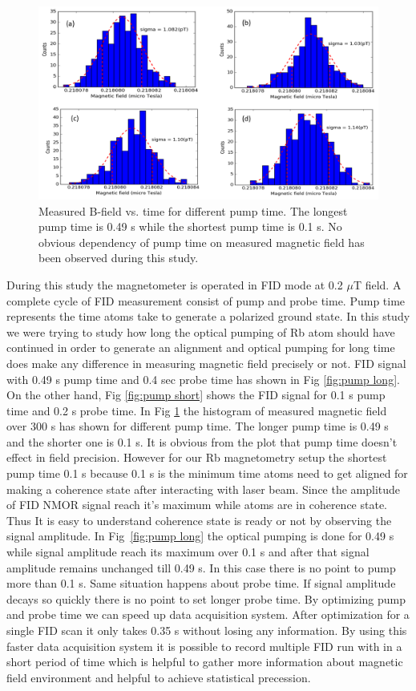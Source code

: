    \begin{figure}[h]
\centering\includegraphics[width=0.75\linewidth]{figures/pump_time}
\caption{Measured B-field vs. time   for different pump time. The longest pump time is 0.49 s while the shortest pump time is 0.1 s. No obvious dependency of pump time on  measured magnetic field has been observed during this study.\label{fig:different pump time}}
\end{figure}
During this study the magnetometer is operated in FID mode at 0.2 $ \mu$T field.  A complete cycle of FID measurement consist of pump and probe time. Pump time represents the time atoms take to generate a polarized ground state. In this study we were trying to study how long the optical pumping of Rb atom should have continued in order to generate an alignment and optical pumping for long time does make any difference in measuring magnetic field precisely or not. FID signal with 0.49 s pump time and 0.4 sec probe time has shown in Fig \ref{fig:pump long}. On the other hand, Fig \ref{fig:pump short} shows  the FID signal for 0.1 s pump time and 0.2 s probe time. In Fig \ref{fig:different pump time} the histogram of measured magnetic field over 300 s has shown for different pump time. The longer pump time is 0.49 s   and the shorter one is 0.1 s. It is obvious from the plot that pump time doesn't effect in field precision. However for our Rb magnetometry setup the shortest pump time  0.1 s because 0.1 s is the minimum time atoms need to get aligned for making a coherence state after interacting with laser beam. Since the amplitude of FID NMOR signal reach it's maximum while atoms are in coherence state. Thus It is easy to understand coherence state is ready or not by observing the signal amplitude. In Fig~\ref{fig:pump long} the optical pumping is done for 0.49 s while signal amplitude reach its maximum over 0.1 s and after that signal amplitude remains unchanged till 0.49 s. In this case there is no point to pump more than 0.1 s. Same situation happens about probe time. If signal amplitude decays so quickly there is no point to set longer probe time. By optimizing pump and probe time we can speed up data acquisition system. After optimization for a single FID scan it only takes 0.35 s  without losing any information. By using this faster data acquisition system it is possible to record multiple FID run with in a short period of time which is helpful to gather more information about magnetic field environment and helpful to achieve statistical precession.
